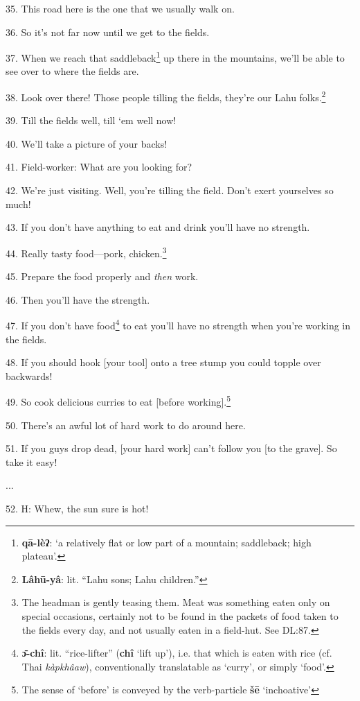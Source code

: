 35. This road here is the one that we usually walk on.

36. So it's not far now until we get to the fields.

37. When we reach that saddleback\footnote{\textbf{qā-lèʔ}: `a relatively flat or low part of a mountain; saddleback; high plateau'.} up there in the mountains, we'll be able
to see over to where the fields are.

38. Look over there! Those people tilling the fields, they're our Lahu folks.\footnote{\textbf{Lâhū-yâ}: lit. ``Lahu sons; Lahu children.''}

39.  Till the fields well, till `em
well now!

40. We'll take a picture of your backs!

41. Field-worker: What are you looking for?

42. We're just visiting. Well, you're tilling the field. Don't exert yourselves
so much!

43. If you don't have anything to eat and drink you'll have no strength.

44. Really tasty food---pork, chicken.\footnote{The headman is gently teasing them. Meat was something eaten only on special occasions, certainly not to be found in the packets of food taken to the fields every day, and not usually eaten in a field-hut. See DL:87.}

45. Prepare the food properly and \textit{then} work.

46. Then you'll have the strength.

47. If you don't have food\footnote{\textbf{ɔ̄-chî}: lit. ``rice-lifter'' (\textbf{chî} `lift up'), i.e. that which is eaten with rice (cf. Thai \textit{kàpkhâaw}), conventionally translatable as `curry', or simply `food'.} to eat you'll have no strength when you're working
in the fields.

48. If you should hook [your tool] onto a tree stump you could topple over backwards!

49. So cook delicious curries to eat [before working].\footnote{The sense of `before' is conveyed by the verb-particle \textbf{šē} `inchoative'}

50. There's an awful lot of hard work to do around here.

51. If you guys drop dead, [your hard work] can't follow you [to the grave]. So
take it easy!

...

52. H: Whew, the sun sure is hot!


